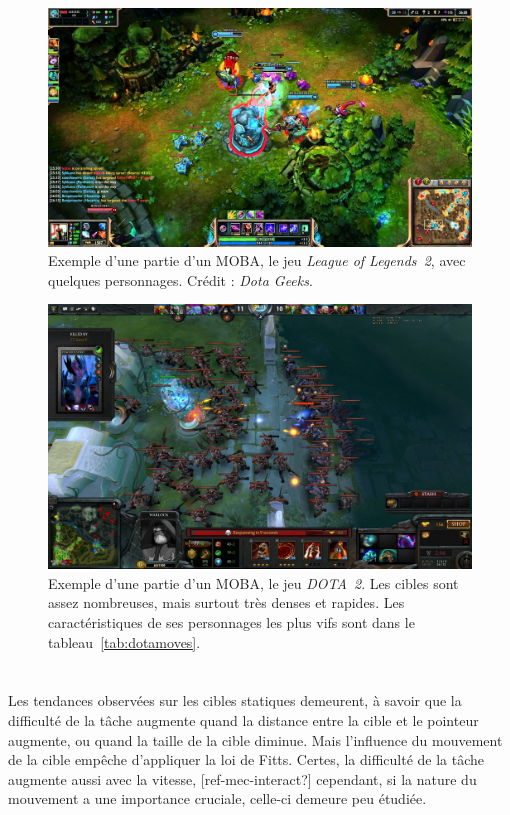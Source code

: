 	\begin{figure}[ht]
		\centering
		\includegraphics[width=\textwidth]{figures/lol2}
		\caption{Exemple d'une partie d'un MOBA, le jeu \emph{League of Legends~2}, avec quelques personnages. Crédit : \emph{Dota Geeks}.}
		\label{fig:lol2}
	\end{figure}
	
	\begin{figure}[ht]
		\centering
		\includegraphics[width=\textwidth]{figures/dota2}
		\caption{Exemple d'une partie d'un MOBA, le jeu \emph{DOTA~2}. Les cibles sont assez nombreuses, mais surtout très denses et rapides. Les caractéristiques de ses personnages les plus vifs sont dans le tableau~\ref{tab:dotamoves}.}
		\label{fig:dota2}
	\end{figure}
	
	
	\section{}    
	Les tendances observées sur les cibles statiques demeurent, à savoir que la difficulté de la tâche augmente quand la distance entre la cible et le pointeur augmente, ou quand la taille de la cible diminue. Mais l'influence du mouvement de la cible empêche d'appliquer la loi de Fitts. Certes, la difficulté de la tâche augmente aussi avec la vitesse, [ref-mec-interact?] cependant, si la nature du mouvement a une importance cruciale, celle-ci demeure peu étudiée.
    
